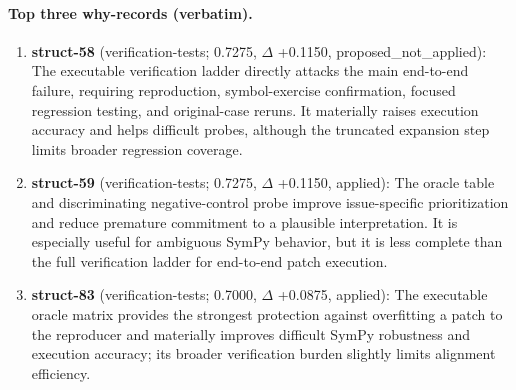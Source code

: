 \paragraph{Top three why-records (verbatim).}\begin{enumerate}\itemsep1pt
\item \textbf{struct-58} (verification-tests; 0.7275, $\Delta$ +0.1150, proposed\_not\_applied): The executable verification ladder directly attacks the main end-to-end failure, requiring reproduction, symbol-exercise confirmation, focused regression testing, and original-case reruns. It materially raises execution accuracy and helps difficult probes, although the truncated expansion step limits broader regression coverage.
\item \textbf{struct-59} (verification-tests; 0.7275, $\Delta$ +0.1150, applied): The oracle table and discriminating negative-control probe improve issue-specific prioritization and reduce premature commitment to a plausible interpretation. It is especially useful for ambiguous SymPy behavior, but it is less complete than the full verification ladder for end-to-end patch execution.
\item \textbf{struct-83} (verification-tests; 0.7000, $\Delta$ +0.0875, applied): The executable oracle matrix provides the strongest protection against overfitting a patch to the reproducer and materially improves difficult SymPy robustness and execution accuracy; its broader verification burden slightly limits alignment efficiency.
\end{enumerate}

